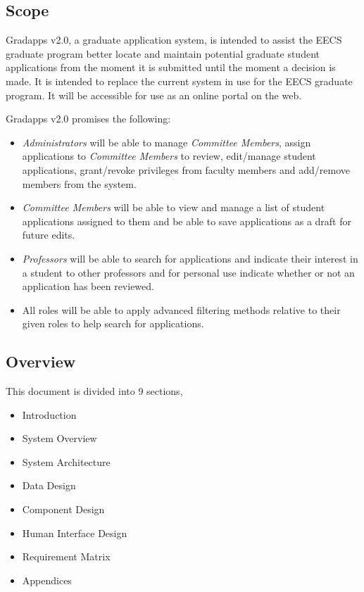 \documentclass[fontsize=12pt,paper=letter,twoside]{scrartcl}
\begin{document}
\subsection{Scope}

Gradapps v2.0, a graduate application system, is intended to assist the EECS graduate program better locate and maintain potential graduate student applications from the moment it is submitted until the moment a decision is made. It is intended to replace the current system in use for the EECS graduate program. It will be accessible for use as an online portal on the web.

\smallskip
\noindent Gradapps v2.0 promises the following:
\begin{itemize}
\item \emph{Administrators} will be able to manage \emph{Committee Members}, assign applications to \emph{Committee Members} to review, edit/manage student applications, grant/revoke privileges from faculty members and add/remove members from the system.
\item \emph{Committee Members} will be able to view and manage a list of student applications assigned to them and be able to save applications as a draft for future edits.
\item \emph{Professors} will be able to search for applications and indicate their interest in a student to other professors and for personal use indicate whether or not an application has been reviewed.
\item All roles will be able to apply advanced filtering methods relative to their given roles to help search for applications.
\end{itemize}

\newpage
\subsection{Overview}

This document is divided into 9 sections,

\begin{itemize}
\item Introduction
\item System Overview
\item System Architecture
\item Data Design
\item Component Design
\item Human Interface Design
\item Requirement Matrix
\item Appendices
\end{itemize}
\end{document}
